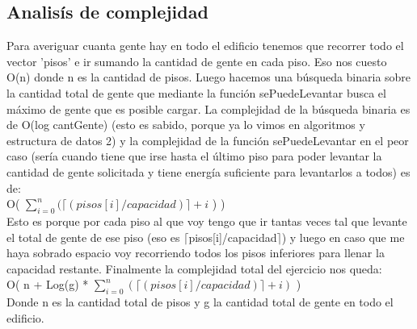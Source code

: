 \subsection{Analisís de complejidad}	
Para averiguar cuanta gente hay en todo el edificio tenemos que recorrer todo el vector 'pisos' e ir sumando la cantidad de gente en cada piso. Eso nos cuesto O(n) donde n es la cantidad de pisos. Luego hacemos una búsqueda binaria sobre la cantidad total de gente que mediante la función sePuedeLevantar busca el máximo de gente que es posible cargar. La complejidad de la búsqueda binaria es de O(log cantGente) (esto es sabido, porque ya lo vimos en algoritmos y estructura de datos 2) y la complejidad de la función sePuedeLevantar en el peor caso (sería cuando tiene que irse hasta el último piso para poder levantar la cantidad de gente solicitada y tiene energía suficiente para levantarlos a todos) es de: \\
	O( $\sum\limits_{i=0}^{n} { ( \lceil (pisos[i]/capacidad) \rceil  + i}$ ) ) \\
Esto es porque por cada piso al que voy tengo que ir tantas veces tal que levante el total de gente de ese piso (eso es $\lceil$pisos[i]/capacidad$\rceil$) y luego en caso que me haya sobrado espacio voy recorriendo todos los pisos inferiores para llenar la capacidad restante.
Finalmente la complejidad total del ejercicio nos queda:\\
O( n + Log(g) * $\sum\limits_{i=0}^{n} { ( \lceil (pisos[i]/capacidad) \rceil  + i ) }$ ) \\
Donde n es la cantidad total de pisos y g la cantidad total de gente en todo el edificio.
